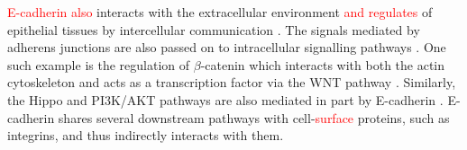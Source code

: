 \textcolor{red}{\gls{E-cadherin} also} interacts with the extracellular environment \textcolor{red}{and regulates} of epithelial tissues by intercellular communication \citep{Jeanes2008}. %
%
The signals mediated by adherens junctions are also passed on to intracellular signalling pathways . %
One such example is the regulation of $\beta$-catenin which interacts with both the actin cytoskeleton and acts as a transcription factor via the WNT pathway \citep{Jeanes2008}. Similarly, the Hippo and PI3K/AKT pathways are also mediated in part by \gls{E-cadherin} \citep{DeSantis2009, Kim2011}. %
\gls{E-cadherin} shares several downstream pathways with cell-\textcolor{red}{surface} proteins, such as integrins, and thus indirectly interacts with them. %


